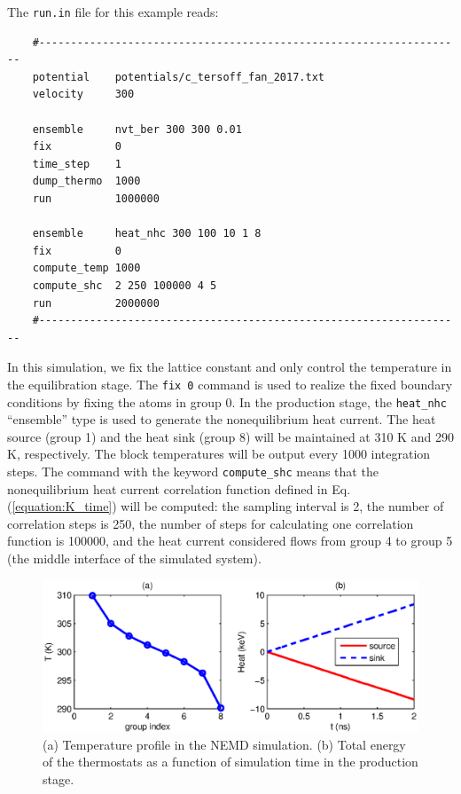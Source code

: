 \documentclass[12pt,a4paper]{report}
\begin{document}
The \verb"run.in" file for this example reads:
\begin{verbatim}
    #-------------------------------------------------------------------
    potential    potentials/c_tersoff_fan_2017.txt
    velocity     300

    ensemble     nvt_ber 300 300 0.01
    fix          0
    time_step    1
    dump_thermo  1000
    run          1000000

    ensemble     heat_nhc 300 100 10 1 8
    fix          0
    compute_temp 1000
    compute_shc  2 250 100000 4 5
    run          2000000
    #-------------------------------------------------------------------
\end{verbatim}

In this simulation, we fix the lattice constant and only control the temperature in the equilibration stage. The \verb"fix 0" command is used to realize the fixed boundary conditions by fixing the atoms in group 0. In the production stage, the \verb"heat_nhc" ``ensemble'' type is used to generate the nonequilibrium heat current.  The heat source (group 1) and the heat sink (group 8) will be maintained at 310 K and 290 K, respectively. The block temperatures will be output every 1000 integration steps. The command with the keyword \verb"compute_shc" means that the nonequilibrium heat current correlation function defined in Eq. (\ref{equation:K_time}) will be computed: the sampling interval is 2, the number of correlation steps is 250, the number of steps for calculating one correlation function is 100000, and the heat current considered flows from group 4 to group 5 (the middle interface of the simulated system).


\begin{figure}[ht]
\begin{center}
\includegraphics[width=\columnwidth]{ex4a.eps}
\caption{(a) Temperature profile in the NEMD simulation. (b) Total energy of the thermostats as a function of simulation time in the production stage. }
\label{figure:ex4a}
\end{center}
\end{figure}
\end{document}
